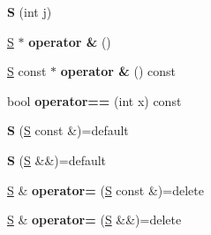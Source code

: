 \begin{DoxyCompactItemize}
{\bfseries S} (int j)
\item 
\mbox{\label{struct_s_a00d1f90fe9feced72f6d939ca145dc9b}} 
\mbox{\hyperlink{struct_s}{S}} $\ast$ {\bfseries operator \&} ()
\item 
\mbox{\label{struct_s_ad02c5c713645fa97ebcd9a3c5a314208}} 
\mbox{\hyperlink{struct_s}{S}} const  $\ast$ {\bfseries operator \&} () const
\item 
\mbox{\label{struct_s_aae714db91894aef75945834b068f83b4}} 
bool {\bfseries operator==} (int x) const
\item 
\mbox{\label{struct_s_a6d0bdcec8d104b0f2ec886c763158b02}} 
{\bfseries S} (\mbox{\hyperlink{struct_s}{S}} const \&)=default
\item 
\mbox{\label{struct_s_a7a454e521251e0590f4d2226757dd3c1}} 
{\bfseries S} (\mbox{\hyperlink{struct_s}{S}} \&\&)=default
\item 
\mbox{\label{struct_s_a5056b2922af850fe92fe413619e7cb93}} 
\mbox{\hyperlink{struct_s}{S}} \& {\bfseries operator=} (\mbox{\hyperlink{struct_s}{S}} const \&)=delete
\item 
\mbox{\label{struct_s_ad9d0773734db6c368615a57c928cde7b}} 
\mbox{\hyperlink{struct_s}{S}} \& {\bfseries operator=} (\mbox{\hyperlink{struct_s}{S}} \&\&)=delete
\end{DoxyCompactItemize}
